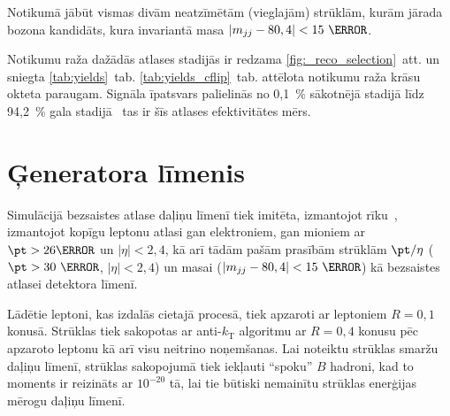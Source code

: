 Notikumā jābūt vismas divām neatzīmētām (vieglajām) strūklām, kurām jārada \PW bozona kandidāts, kura invariantā masa $\left|m_{jj}-80,4\right|<15~\GeV$.

Notikumu raža dažādās atlases stadijās ir redzama \ref{fig:_reco_selection}~att. un sniegta \ref{tab:yields}~tab. \ref{tab:yields_cflip}~tab. attēlota notikumu raža krāsu okteta \PW paraugam. Signāla īpatsvars palielinās no 0,1~\% sākotnējā stadijā līdz 94,2~\% gala stadijā \textendash\ tas ir šīs atlases efektivitātes mērs.






\section{Ģeneratora līmenis}
\label{sec:generator_level}

Simulācijā bezsaistes atlase daļiņu līmenī tiek imitēta, izmantojot \PSEUDOTOPPRODUCER rīku~\cite{code:pseudotop}, izmantojot kopīgu leptonu atlasi gan elektroniem, gan mioniem ar $\pt>26\GeV$ un $|\eta|<2,4$, kā arī tādām pašām prasībām strūklām $\pt/\eta$ ($\pt>30~\GeV$, $|\eta|<2,4$) un \PW masai ($\left|m_{jj}-80,4\right|<15~\GeV$) kā bezsaistes atlasei detektora līmenī.

Lādētie leptoni, kas izdalās cietajā procesā, tiek apzaroti ar leptoniem $R=0,1$ konusā. Strūklas tiek sakopotas ar anti-$k_\text{T}$ algoritmu ar $R=0,4$ konusu pēc apzaroto leptonu kā arī visu neitrino noņemšanas. Lai noteiktu strūklas smaržu daļiņu līmenī, strūklas sakopojumā tiek iekļauti ``spoku'' $B$ hadroni, kad to moments ir reizināts ar $10^{-20}$ tā, lai tie būtiski nemainītu strūklas enerģijas mērogu daļiņu līmenī.
